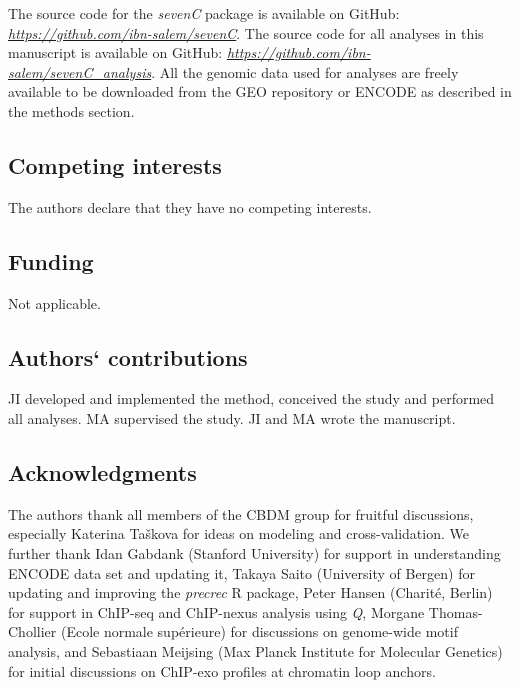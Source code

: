 \documentclass[a4paper,twoside=true,openright,parskip=full,chapterprefix=true,11pt,headings=normal,bibliography=totoc,listof=totoc,titlepage=on,captions=tableabove,draft=false]{scrreprt}
\theoremstyle{definition}
\theoremstyle{definition}
\theoremstyle{definition}
\theoremstyle{remark}
\begin{document}
The source code for the \emph{sevenC} package is available on GitHub:
\href{https://github.com/ibn-salem/sevenC}{\emph{https://github.com/ibn-salem/sevenC}}.
The source code for all analyses in this manuscript is available on
GitHub:
\href{https://github.com/ibn-salem/sevenC_analysis}{\emph{https://github.com/ibn-salem/sevenC\_analysis}}.
All the genomic data used for analyses are freely available to be
downloaded from the GEO repository or ENCODE as described in the methods
section.

\hypertarget{competing-interests-1}{%
\subsection{Competing interests}\label{competing-interests-1}}

The authors declare that they have no competing interests.

\hypertarget{funding-1}{%
\subsection{Funding}\label{funding-1}}

Not applicable.

\hypertarget{authors-contributions-1}{%
\subsection{Authors` contributions}\label{authors-contributions-1}}

JI developed and implemented the method, conceived the study and
performed all analyses. MA supervised the study. JI and MA wrote the
manuscript.

\hypertarget{acknowledgments-1}{%
\subsection{Acknowledgments}\label{acknowledgments-1}}

The authors thank all members of the CBDM group for fruitful
discussions, especially Katerina Taškova for ideas on modeling and
cross-validation. We further thank Idan Gabdank (Stanford University)
for support in understanding ENCODE data set and updating it, Takaya
Saito (University of Bergen) for updating and improving the
\emph{precrec} R package, Peter Hansen (Charité, Berlin) for support in
ChIP-seq and ChIP-nexus analysis using \emph{Q}, Morgane Thomas-Chollier
(Ecole normale supérieure) for discussions on genome-wide motif
analysis, and Sebastiaan Meijsing (Max Planck Institute for Molecular
Genetics) for initial discussions on ChIP-exo profiles at chromatin loop
anchors.
\end{document}
